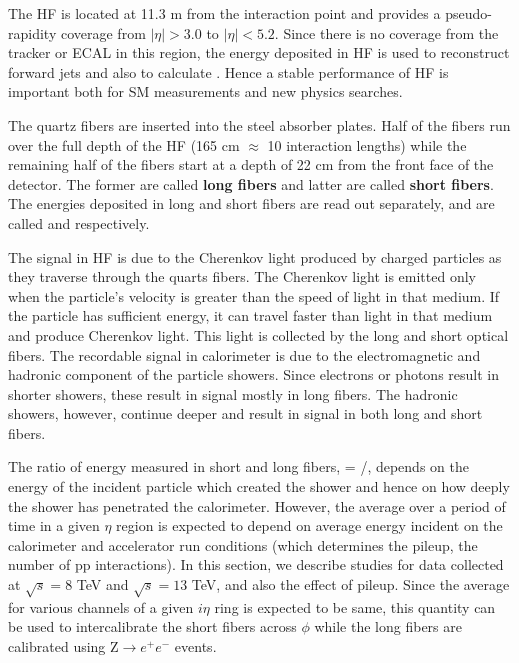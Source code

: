 The HF is located at 11.3 m from the interaction point and provides a
pseudo-rapidity coverage from $|\eta|>3.0$ to $|\eta|<5.2$. Since
there is no coverage from the tracker or ECAL in this region, the energy deposited in HF
is used to reconstruct forward jets and also to calculate
\ptmiss. Hence a stable performance of HF is important both for SM
measurements and new physics searches.

The quartz fibers are inserted into the steel absorber plates. Half
of the fibers run over the full depth of the HF (165 cm $\approx$ 10
interaction lengths) while the remaining half of the fibers start at a
depth of 22 cm from the front face of the detector. The former
are called {\bf long fibers} and latter are called {\bf short
  fibers}. The energies deposited in long and short fibers are read
out separately, and are called {\elong} and {\eshort} respectively.

The signal in HF is due to the Cherenkov light produced by charged particles as they traverse through the quarts fibers. The
Cherenkov light is emitted only when the particle's velocity is greater than the speed of light in that medium. If the particle has sufficient energy, it can travel faster than light in that medium and produce Cherenkov light. This light is collected by the long and short optical fibers. The recordable signal in calorimeter is due to the electromagnetic and hadronic component of the particle showers. Since electrons or photons result in shorter showers, these result in signal mostly
in long fibers. The hadronic showers, however, continue deeper and
result in signal in both long and short fibers.

The ratio of energy measured in short and long fibers,
\ratiosl = \eshort/\elong, depends on the energy of the incident
particle which created the shower and hence on how deeply the shower
has penetrated the calorimeter. However, the average \ratiosl
over a period of time in a given $\eta$ region is expected
to depend on average energy incident on the calorimeter and
accelerator run conditions (which determines the pileup, the number of pp interactions). In this
section, we describe studies \ratiosl for data collected at $\sqrt{s} = 8$
TeV and  $\sqrt{s} = 13$ TeV, and also the effect of pileup. 
Since the average \ratiosl for various channels of a
given $i\eta$ ring is expected to be same, this quantity can
be used to intercalibrate the short fibers across $\phi$
while the long fibers are calibrated using Z$\rightarrow e^+e^-$ events.

